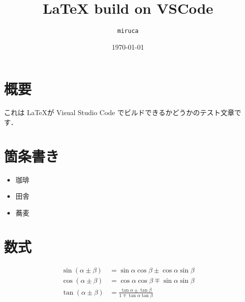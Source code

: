 \documentclass[a4j,uplatex]{jsarticle}
\begin{document}
\title{{\LaTeX} build on VSCode}
\author{\texttt{miruca}}
\date{\today}
\maketitle

\section{概要}
これは \LaTeX が Visual Studio Code でビルドできるかどうかのテスト文章です．

\section{箇条書き}
\begin{itemize}
    \item 珈琲
    \item 田舎
    \item 蕎麦
\end{itemize}

\section{数式}
\begin{align}
    \sin(\alpha \pm \beta) &= \sin \alpha \cos \beta \pm \cos \alpha \sin \beta \\
    \cos(\alpha \pm \beta) &= \cos \alpha \cos \beta \mp \sin \alpha \sin \beta \\
    \tan(\alpha \pm \beta) &= \frac{\tan \alpha \pm \tan \beta}{1 \mp \tan \alpha \tan \beta}
    \end{align}
\end{document}
